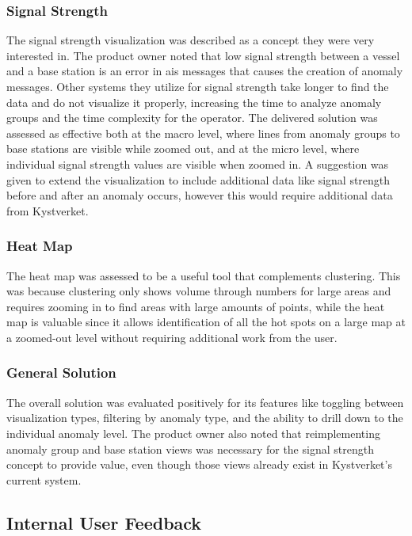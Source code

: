 \subsubsection{Signal Strength}

The signal strength visualization was described as a concept they were very interested in. The product owner noted that low signal strength between a vessel and a base station is an error in \acrshort{ais} messages that causes the creation of anomaly messages. Other systems they utilize for signal strength take longer to find the data and do not visualize it properly, increasing the time to analyze anomaly groups and the time complexity for the operator. The delivered solution was assessed as effective both at the macro level, where lines from anomaly groups to base stations are visible while zoomed out, and at the micro level, where individual signal strength values are visible when zoomed in. A suggestion was given to extend the visualization to include additional data like signal strength before and after an anomaly occurs, however this would require additional data from Kystverket.

\subsubsection{Heat Map}

The heat map was assessed to be a useful tool that complements clustering. This was because clustering only shows volume through numbers for large areas and requires zooming in to find areas with large amounts of points, while the heat map is valuable since it allows identification of all the hot spots on a large map at a zoomed-out level without requiring additional work from the user.

\subsubsection{General Solution}

The overall solution was evaluated positively for its features like toggling between visualization types, filtering by anomaly type, and the ability to drill down to the individual anomaly level. The product owner also noted that reimplementing anomaly group and base station views was necessary for the signal strength concept to provide value, even though those views already exist in Kystverket's current system.

\subsection{Internal User Feedback}

